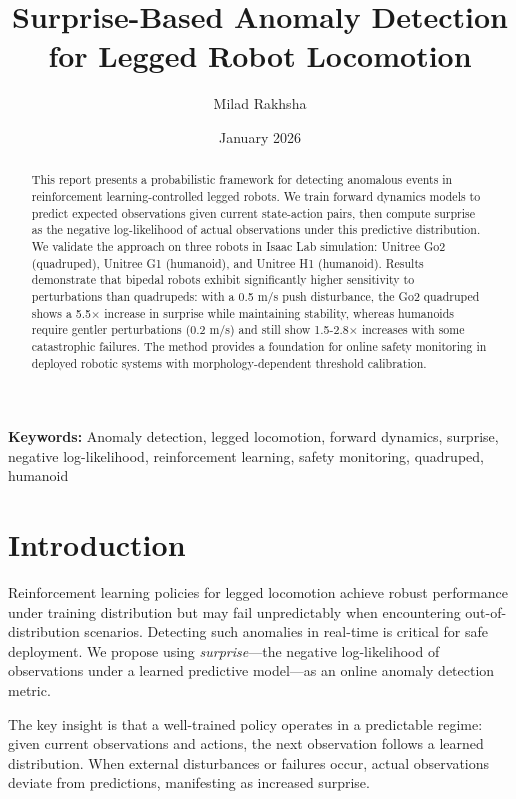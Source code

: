 \documentclass[11pt,a4paper]{article}
\title{Surprise-Based Anomaly Detection for Legged Robot Locomotion}
\author{Milad Rakhsha}
\date{January 2026}
\begin{document}
\maketitle

\begin{abstract}
This report presents a probabilistic framework for detecting anomalous events in reinforcement learning-controlled legged robots. We train forward dynamics models to predict expected observations given current state-action pairs, then compute surprise as the negative log-likelihood of actual observations under this predictive distribution. We validate the approach on three robots in Isaac Lab simulation: Unitree Go2 (quadruped), Unitree G1 (humanoid), and Unitree H1 (humanoid). Results demonstrate that bipedal robots exhibit significantly higher sensitivity to perturbations than quadrupeds: with a 0.5 m/s push disturbance, the Go2 quadruped shows a 5.5$\times$ increase in surprise while maintaining stability, whereas humanoids require gentler perturbations (0.2 m/s) and still show 1.5-2.8$\times$ increases with some catastrophic failures. The method provides a foundation for online safety monitoring in deployed robotic systems with morphology-dependent threshold calibration.
\end{abstract}

\noindent\textbf{Keywords:} Anomaly detection, legged locomotion, forward dynamics, surprise, negative log-likelihood, reinforcement learning, safety monitoring, quadruped, humanoid

\section{Introduction}

Reinforcement learning policies for legged locomotion achieve robust performance under training distribution but may fail unpredictably when encountering out-of-distribution scenarios. Detecting such anomalies in real-time is critical for safe deployment. We propose using \textit{surprise}---the negative log-likelihood of observations under a learned predictive model---as an online anomaly detection metric.

The key insight is that a well-trained policy operates in a predictable regime: given current observations and actions, the next observation follows a learned distribution. When external disturbances or failures occur, actual observations deviate from predictions, manifesting as increased surprise.
\end{document}
